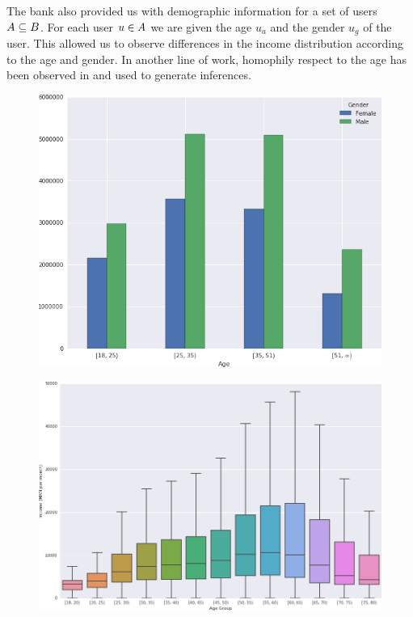 The bank also provided us with demographic information for a set of users \( \mathlarger{A} \subseteq \mathlarger{B} \). For each user \( u \in \mathlarger{A} \) we are given  the age \( u_a \) and the gender \( u_g \) of the user. This allowed us to observe differences in the income distribution according to the age and gender. In another line of work, homophily respect to the age has been observed in \cite{brea2014} and used to generate inferences.

\begin{figure}[h]
\begin{center}
\includegraphics[width=1\columnwidth]{figures/gender_age_bar3/gender_age_bar3.png}
\caption{ \protect}
\label{gender_age_bar}
\end{center}
\end{figure}

\begin{figure}[h]
\begin{center}
\includegraphics[width=1\columnwidth]{figures/income_age_boxplot4/income_age_boxplot4.png}
\caption{ \protect}
\label{income_age_boxplot}
\end{center}
\end{figure}

